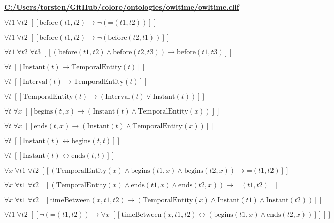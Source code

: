 \documentclass{article}
\begin{document}
\textbf{\url{C:/Users/torsten/GitHub/colore/ontologies/owltime/owltime.clif}}

$\forall t1\; \forall t2\;  \left[ \left[ \textrm{before}(t1,t2) \rightarrow \neg \left(\textrm{=}(t1,t2)\right) \right] \right]$

$\forall t1\; \forall t2\;  \left[ \left[ \textrm{before}(t1,t2) \rightarrow \neg \left(\textrm{before}(t2,t1)\right) \right] \right]$

$\forall t1\; \forall t2\; \forall t3\;  \left[ \left[ \left(\textrm{before}(t1,t2) \land \textrm{before}(t2,t3)\right) \rightarrow \textrm{before}(t1,t3) \right] \right]$

$\forall t\;  \left[ \left[ \textrm{Instant}(t) \rightarrow \textrm{TemporalEntity}(t) \right] \right]$

$\forall t\;  \left[ \left[ \textrm{Interval}(t) \rightarrow \textrm{TemporalEntity}(t) \right] \right]$

$\forall t\;  \left[ \left[ \textrm{TemporalEntity}(t) \rightarrow \left(\textrm{Interval}(t) \lor \textrm{Instant}(t)\right) \right] \right]$

$\forall t\; \forall x\;  \left[ \left[ \textrm{begins}(t,x) \rightarrow \left(\textrm{Instant}(t) \land \textrm{TemporalEntity}(x)\right) \right] \right]$

$\forall t\; \forall x\;  \left[ \left[ \textrm{ends}(t,x) \rightarrow \left(\textrm{Instant}(t) \land \textrm{TemporalEntity}(x)\right) \right] \right]$

$\forall t\;  \left[ \left[ \textrm{Instant}(t) \leftrightarrow \textrm{begins}(t,t) \right] \right]$

$\forall t\;  \left[ \left[ \textrm{Instant}(t) \leftrightarrow \textrm{ends}(t,t) \right] \right]$

$\forall x\; \forall t1\; \forall t2\;  \left[ \left[ \left(\textrm{TemporalEntity}(x) \land \textrm{begins}(t1,x) \land \textrm{begins}(t2,x)\right) \rightarrow \textrm{=}(t1,t2) \right] \right]$

$\forall x\; \forall t1\; \forall t2\;  \left[ \left[ \left(\textrm{TemporalEntity}(x) \land \textrm{ends}(t1,x) \land \textrm{ends}(t2,x)\right) \rightarrow \textrm{=}(t1,t2) \right] \right]$

$\forall x\; \forall t1\; \forall t2\;  \left[ \left[ \textrm{timeBetween}(x,t1,t2) \rightarrow \left(\textrm{TemporalEntity}(x) \land \textrm{Instant}(t1) \land \textrm{Instant}(t2)\right) \right] \right]$

$\forall t1\; \forall t2\;  \left[ \left[ \neg \left(\textrm{=}(t1,t2)\right) \rightarrow \forall x\;  \left[ \left[ \textrm{timeBetween}(x,t1,t2) \leftrightarrow \left(\textrm{begins}(t1,x) \land \textrm{ends}(t2,x)\right) \right] \right] \right] \right]$
\end{document}
